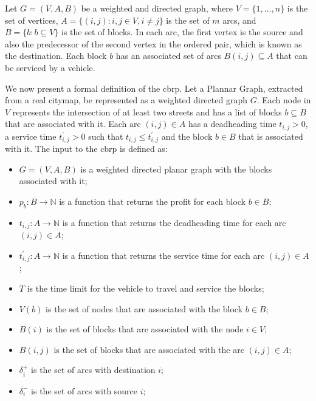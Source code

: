 Let $G = (V, A, B)$ be a weighted and directed graph, where $V = \{1, \dots,
	n\}$ is the set of vertices, $A = \{(i, j) : i, j \in V, i \neq j\}$ is the
set of $m$ arcs, and $B = \{b : b \subseteq V\}$ is the set of blocks. In
each arc, the first vertex is the source and also the predecessor of the
second vertex in the ordered pair, which is known as the destination. Each
block $b$ has an associated set of arcs $B(i, j) \subseteq A$ that can be
serviced by a vehicle. 

We now present a formal definition of the \gls{cbrp}. Let a Plannar Graph,
extracted from a real citymap, be represented as a weighted directed graph $G$.
Each node in $V$ represents the intersection of at least two streets and has a
list of blocks $b \subseteq B$ that are associated with it. Each arc $(i, j) \in
	A$ has a deadheading time $t_{i, j} > 0$, a service time $t^{'}_{i, j} > 0$ such
that $t_{i, j} \leqslant t^{'}_{i, j}$ and the block $b \in B$ that is
associated with it. The input to the \gls{cbrp} is defined as:

\begin{itemize}
	\item $G = (V, A, B)$ is a weighted directed planar graph with the blocks associated with it;
	\item $p_b : B \rightarrow \mathbb{N}$ is a function that returns the profit
	      for each block $b \in B$;
	\item $t_{i, j} : A \rightarrow \mathbb{N}$ is a function that returns the
	      deadheading time for each arc $(i, j) \in A$;
	\item $t^{'}_{i, j} : A \rightarrow \mathbb{N}$ is a function that returns
	      the service time for each arc $(i, j) \in A$;
	\item $T$ is the time limit for the vehicle to travel and service the blocks;
	\item $V(b)$ is the set of nodes that are associated with the block $b \in B$;
	\item $B(i)$ is the set of blocks that are associated with the node $i \in V$;
	\item $B(i, j)$ is the set of blocks that are associated with the arc $(i, j) \in A$;
	\item $\delta^{+}_{i}$ is the set of arcs with destination $i$;
	\item $\delta^{-}_{i}$ is the set of arcs with source $i$;
\end{itemize}

